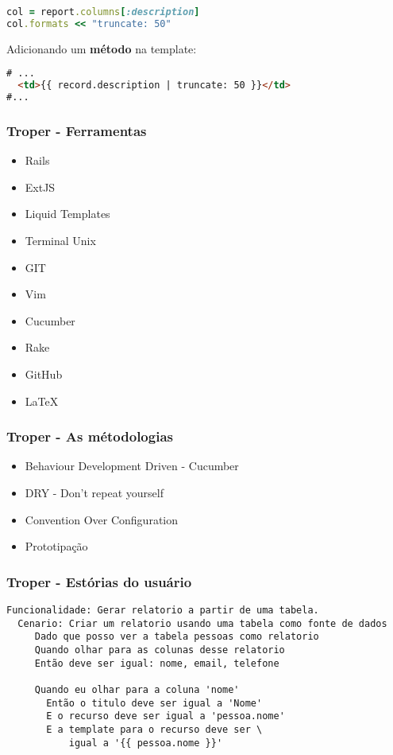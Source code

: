 \documentclass{beamer}
\begin{document}
\begin{frame}[fragile]
\begin{lstlisting}[language=ruby, caption=Adicionando formatadores]
col = report.columns[:description]
col.formats << "truncate: 50"
\end{lstlisting}

Adicionando um \textbf{método} na template:

\begin{lstlisting}[language=html, caption=Exibindo na template]
# ...
  <td>{{ record.description | truncate: 50 }}</td>
#...
\end{lstlisting}

\end{frame}

\begin{frame} 
\frametitle{Troper - Ferramentas}
  \begin{itemize} 
    \item Rails
    \item ExtJS 
    \item Liquid Templates 
    \item Terminal Unix 
    \item GIT 
    \item Vim 
    \item Cucumber
    \item Rake 
    \item GitHub 
    \item LaTeX
  \end{itemize} 
\end{frame}

\begin{frame}
\frametitle{Troper - As métodologias}
  \begin{itemize} 
    \item Behaviour Development Driven - Cucumber
    \item DRY - Don't repeat yourself 
    \item Convention Over Configuration
    \item Prototipação 
  \end{itemize} 
\end{frame}
\begin{frame}[fragile]
\frametitle{Troper - Estórias do usuário}
\begin{verbatim}
Funcionalidade: Gerar relatorio a partir de uma tabela.
  Cenario: Criar um relatorio usando uma tabela como fonte de dados
     Dado que posso ver a tabela pessoas como relatorio
     Quando olhar para as colunas desse relatorio
     Então deve ser igual: nome, email, telefone

     Quando eu olhar para a coluna 'nome'
       Então o titulo deve ser igual a 'Nome'
       E o recurso deve ser igual a 'pessoa.nome'
       E a template para o recurso deve ser \
           igual a '{{ pessoa.nome }}'
\end{verbatim}
\end{frame}
\end{document}
